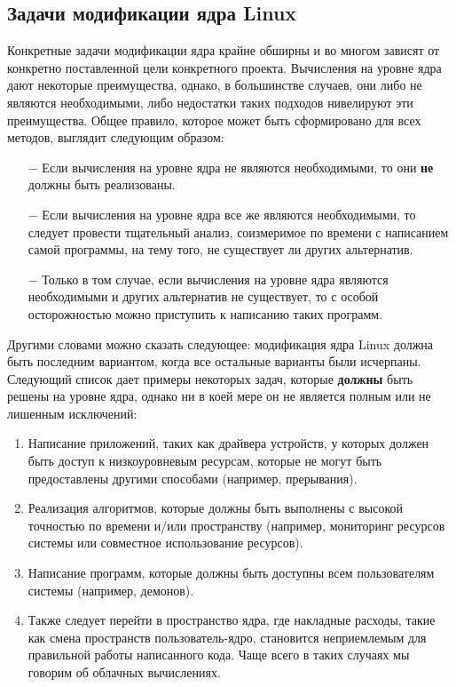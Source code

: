 \subsection{Задачи модификации ядра Linux}\label{subsec:---linux}

Конкретные задачи модификации ядра крайне обширны и во многом зависят от конкретно поставленной цели конкретного проекта.
Вычисления на уровне ядра дают некоторые преимущества, однако, в большинстве случаев, они либо не являются необходимыми, либо недостатки таких подходов нивелируют эти преимущества.
Общее правило, которое может быть сформировано для всех методов, выглядит следующим образом:
\begin{itemize}
    \item[$-$] Если вычисления на уровне ядра не являются необходимыми, то они \textbf{не} должны быть реализованы.
    \vspace{5mm}\\
    \item[$-$] Если вычисления на уровне ядра все же являются необходимыми, то следует провести тщательный анализ, соизмеримое по времени с написанием самой программы, на тему того, не существует ли других альтернатив.
    \item[$-$] Только в том случае, если вычисления на уровне ядра являются необходимыми и других альтернатив не существует, то с особой осторожностью можно приступить к написанию таких программ.
\end{itemize}

Другими словами можно сказать следующее: модификация ядра Linux должна быть последним вариантом,
когда все остальные варианты были исчерпаны.
\\
Следующий список дает примеры некоторых задач, которые \textbf{должны} быть решены на уровне ядра, однако ни в коей мере он не является полным или не лишенным исключений:

\begin{enumerate}
    \item Написание приложений, таких как драйвера устройств, у которых должен быть доступ к низкоуровневым ресурсам, которые не могут быть предоставлены другими способами (например, прерывания).
    \item Реализация алгоритмов, которые должны быть выполнены с высокой точностью по времени и/или пространству (например, мониторинг ресурсов системы или совместное использование ресурсов).
    \item Написание программ, которые должны быть доступны всем пользователям системы (например, демонов).
    \item Также следует перейти в пространство ядра, где накладные расходы, такие как смена пространств пользователь-ядро, становится неприемлемым для правильной работы написанного кода.
    Чаще всего в таких случаях мы говорим об облачных вычислениях.
\end{enumerate}

